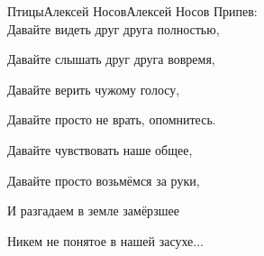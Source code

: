 \documentclass[11pt,a5paper]{book}
\begin{document}
\begin{song}{Птицы}{}{Алексей Носов}{Алексей Носов}{}{}
Припев:\\

Давайте видеть друг друга полностью,\par
Давайте слышать друг друга вовремя,\par
Давайте верить чужому голосу,\par
Давайте просто не врать, опомнитесь.\par
Давайте чувствовать наше общее,\par
Давайте просто возьмёмся за руки,\par
И разгадаем в земле замёрзшее\par
Никем не понятое в нашей засухе...\\
\begin{SBSection*}
\begin{figure}[b!]
\end{figure}
\end{SBSection*}
\end{song}
\end{document}
